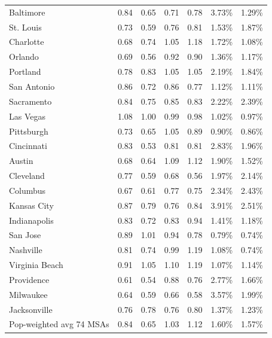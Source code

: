 \documentclass[letterpaper,12pt,dvipsnames,usenames]{article}
\theoremstyle{definition}
\begin{document}
\begin{spacing}{1.0}
\begin{small}
\begin{table}
\begin{center}
{\begin{tabular}{lcccccc}
Baltimore & 0.84  & 0.65  & 0.71  & 0.78  & 3.73\% & 1.29\%  \\
St. Louis &    0.73  & 0.59  & 0.76  & 0.81  & 1.53\% & 1.87\%  \\
Charlotte & 0.68  & 0.74  & 1.05  & 1.18  & 1.72\% & 1.08\%  \\
Orlando &      0.69  & 0.56  & 0.92  & 0.90  & 1.36\% & 1.17\%  \\
Portland & 0.78  & 0.83  & 1.05  & 1.05  & 2.19\% & 1.84\%  \\
San Antonio & 0.86  & 0.72  & 0.86  & 0.77  & 1.12\% & 1.11\%  \\
Sacramento & 0.84  & 0.75  & 0.85  & 0.83  & 2.22\% & 2.39\%  \\
Las Vegas & 1.08  & 1.00  & 0.99  & 0.98  & 1.02\% & 0.97\%  \\
Pittsburgh & 0.73  & 0.65  & 1.05  & 0.89  & 0.90\% & 0.86\%  \\
Cincinnati & 0.83  & 0.53  & 0.81  & 0.81  & 2.83\% & 1.96\%  \\
Austin &   0.68  & 0.64  & 1.09  & 1.12  & 1.90\% & 1.52\%  \\
Cleveland & 0.77  & 0.59  & 0.68  & 0.56  & 1.97\% & 2.14\%  \\
Columbus & 0.67  & 0.61  & 0.77  & 0.75  & 2.34\% & 2.43\%  \\
Kansas City & 0.87  & 0.79  & 0.76  & 0.84  & 3.91\% & 2.51\%  \\
Indianapolis & 0.83  & 0.72  & 0.83  & 0.94  & 1.41\% & 1.18\%  \\
San Jose & 0.89  & 1.01  & 0.94  & 0.78  & 0.79\% & 0.74\%  \\
Nashville & 0.81  & 0.74  & 0.99  & 1.19  & 1.08\% & 0.74\%  \\
Virginia Beach & 0.91  & 1.05  & 1.10  & 1.19  & 1.07\% & 1.14\%  \\
Providence & 0.61  & 0.54  & 0.88  & 0.76  & 2.77\% & 1.66\%  \\
Milwaukee &  0.64  & 0.59  & 0.66  & 0.58  & 3.57\% & 1.99\%  \\
Jacksonville & 0.76  & 0.78  & 0.76  & 0.80  & 1.37\% & 1.23\%  \\ \hline
Pop-weighted avg 74 MSAs &  0.84 & 0.65 & 1.03 & 1.12 & 1.60\% & 1.57\%    \\
\hline
    \end{tabular}%
    }
    \end{center}
  \end{table}%




\end{small}
\end{spacing}
\end{document}
